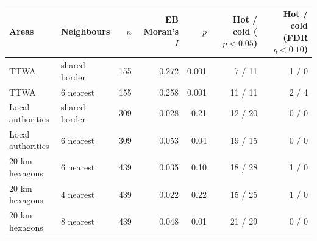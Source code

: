 \begin{tabular}{llrrrrr}
\toprule
Areas & Neighbours & $n$ & EB Moran's $I$ & $p$ & Hot / cold ($p<0.05$) & Hot / cold (FDR $q<0.10$)
\\
\midrule
TTWA & shared border & 155 & 0.272 & 0.001 & 7 / 11 & 1 / 0 \\
TTWA & 6 nearest & 155 & 0.258 & 0.001 & 11 / 11 & 2 / 4 \\
Local authorities & shared border & 309 & 0.028 & 0.21 & 12 / 20 & 0 / 0 \\
Local authorities & 6 nearest & 309 & 0.053 & 0.04 & 19 / 15 & 0 / 0 \\
20 km hexagons & 6 nearest & 439 & 0.035 & 0.10 & 18 / 28 & 1 / 0 \\
20 km hexagons & 4 nearest & 439 & 0.022 & 0.22 & 15 / 25 & 1 / 0 \\
20 km hexagons & 8 nearest & 439 & 0.048 & 0.01 & 21 / 29 & 0 / 0 \\
\bottomrule
\end{tabular}
